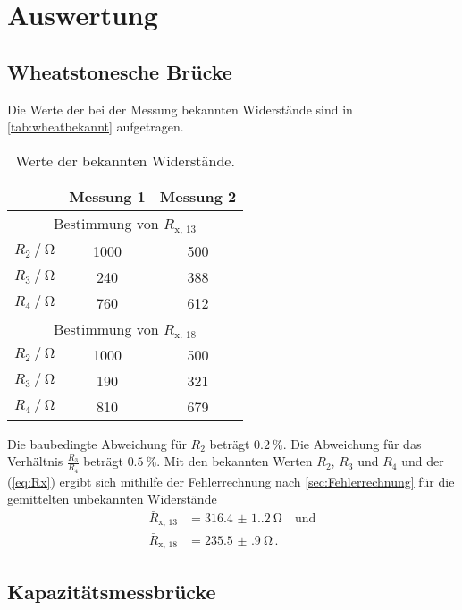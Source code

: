\section{Auswertung}
\label{sec:Auswertung}

\subsection{Wheatstonesche Brücke} \label{sec:wheatausw}

Die Werte der bei der Messung bekannten Widerstände sind in \autoref{tab:wheatbekannt} aufgetragen.
\begin{table}
  \centering
  \caption{Werte der bekannten Widerstände.}
  \label{tab:wheatbekannt}
  \begin{tabular}{lcc}
    \toprule
     & Messung 1 & Messung 2  \\
    \midrule
    \multicolumn{3}{c}{ Bestimmung von $R_{\text{x, 13}}$ } \\
    $R_2 \mathbin{/} \unit{\ohm}$ & 1000 & 500 \\
    $R_3 \mathbin{/} \unit{\ohm}$ &  240 & 388 \\
    $R_4 \mathbin{/} \unit{\ohm}$ &  760 & 612 \\
    \midrule 
    \multicolumn{3}{c}{ Bestimmung von $R_{\text{x. 18}}$ } \\
    $R_2 \mathbin{/} \unit{\ohm}$ & 1000 & 500 \\
    $R_3 \mathbin{/} \unit{\ohm}$ &  190 & 321 \\
    $R_4 \mathbin{/} \unit{\ohm}$ &  810 & 679 \\
    \bottomrule
  \end{tabular}
\end{table}

Die baubedingte Abweichung für $R_2$ beträgt $\qty{0.2}{\percent}$. 
Die Abweichung für das Verhältnis $\frac{R_3}{R_4}$ beträgt $\qty{0.5}{\percent}$.
Mit den bekannten Werten $R_2$, $R_3$ und $R_4$ und der (\ref{eq:Rx}) ergibt sich
mithilfe der Fehlerrechnung nach \autoref{sec:Fehlerrechnung} für die gemittelten unbekannten Widerstände
\begin{align*}
  \bar{R}_\text{x, 13} &= \qty{316.4(1.2)}{\ohm} \quad \text{und} \\
  \bar{R}_\text{x, 18} &= \qty{235.5(9)}{\ohm} \, .
\end{align*}


\subsection{Kapazitätsmessbrücke} \label{sec:kapazausw}

